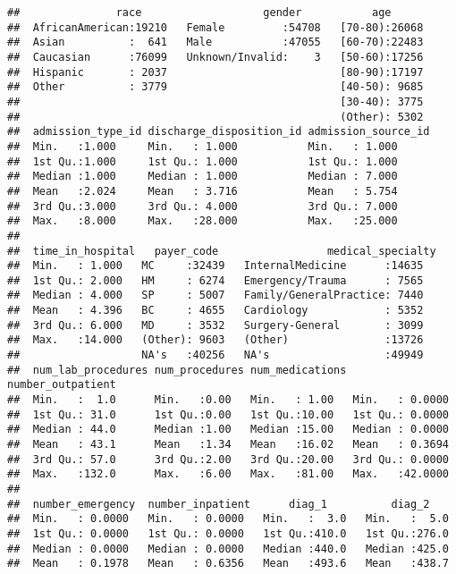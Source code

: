 \documentclass[]{article}
\begin{document}
\begin{verbatim}
##               race                   gender           age       
##  AfricanAmerican:19210   Female         :54708   [70-80):26068  
##  Asian          :  641   Male           :47055   [60-70):22483  
##  Caucasian      :76099   Unknown/Invalid:    3   [50-60):17256  
##  Hispanic       : 2037                           [80-90):17197  
##  Other          : 3779                           [40-50): 9685  
##                                                  [30-40): 3775  
##                                                  (Other): 5302  
##  admission_type_id discharge_disposition_id admission_source_id
##  Min.   :1.000     Min.   : 1.000           Min.   : 1.000     
##  1st Qu.:1.000     1st Qu.: 1.000           1st Qu.: 1.000     
##  Median :1.000     Median : 1.000           Median : 7.000     
##  Mean   :2.024     Mean   : 3.716           Mean   : 5.754     
##  3rd Qu.:3.000     3rd Qu.: 4.000           3rd Qu.: 7.000     
##  Max.   :8.000     Max.   :28.000           Max.   :25.000     
##                                                                
##  time_in_hospital   payer_code                 medical_specialty
##  Min.   : 1.000   MC     :32439   InternalMedicine      :14635  
##  1st Qu.: 2.000   HM     : 6274   Emergency/Trauma      : 7565  
##  Median : 4.000   SP     : 5007   Family/GeneralPractice: 7440  
##  Mean   : 4.396   BC     : 4655   Cardiology            : 5352  
##  3rd Qu.: 6.000   MD     : 3532   Surgery-General       : 3099  
##  Max.   :14.000   (Other): 9603   (Other)               :13726  
##                   NA's   :40256   NA's                  :49949  
##  num_lab_procedures num_procedures num_medications number_outpatient
##  Min.   :  1.0      Min.   :0.00   Min.   : 1.00   Min.   : 0.0000  
##  1st Qu.: 31.0      1st Qu.:0.00   1st Qu.:10.00   1st Qu.: 0.0000  
##  Median : 44.0      Median :1.00   Median :15.00   Median : 0.0000  
##  Mean   : 43.1      Mean   :1.34   Mean   :16.02   Mean   : 0.3694  
##  3rd Qu.: 57.0      3rd Qu.:2.00   3rd Qu.:20.00   3rd Qu.: 0.0000  
##  Max.   :132.0      Max.   :6.00   Max.   :81.00   Max.   :42.0000  
##                                                                     
##  number_emergency  number_inpatient      diag_1          diag_2     
##  Min.   : 0.0000   Min.   : 0.0000   Min.   :  3.0   Min.   :  5.0  
##  1st Qu.: 0.0000   1st Qu.: 0.0000   1st Qu.:410.0   1st Qu.:276.0  
##  Median : 0.0000   Median : 0.0000   Median :440.0   Median :425.0  
##  Mean   : 0.1978   Mean   : 0.6356   Mean   :493.6   Mean   :438.7  

\end{verbatim}
\end{document}
